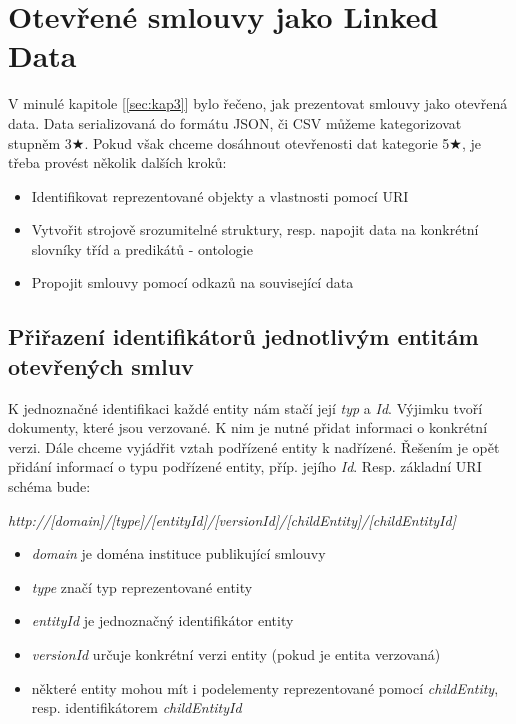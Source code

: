 \chapter{Otevřené smlouvy jako Linked Data}
\label{sec:kap4}

V minulé kapitole [\ref{sec:kap3}] bylo řečeno, jak prezentovat smlouvy jako otevřená data. Data serializovaná do formátu JSON, či CSV můžeme kategorizovat stupněm 3$\bigstar$. Pokud však chceme dosáhnout otevřenosti dat kategorie 5$\bigstar$, je třeba provést několik dalších kroků:

\begin{itemize}
\item Identifikovat reprezentované objekty a vlastnosti pomocí URI
\item Vytvořit strojově srozumitelné struktury, resp. napojit data na konkrétní slovníky tříd a predikátů - ontologie
\item Propojit smlouvy pomocí odkazů na související data
\end{itemize}

\section{Přiřazení identifikátorů jednotlivým entitám otevřených smluv}

K jednoznačné identifikaci každé entity nám stačí její \textit{typ} a \textit{Id}. Výjimku tvoří dokumenty, které jsou verzované. K nim je nutné přidat informaci o konkrétní verzi. Dále chceme vyjádřit vztah podřízené entity k nadřízené. Řešením je opět přidání informací o typu podřízené entity, příp. jejího \textit{Id}. Resp. základní URI schéma bude:

\bigskip

\textit{http://[domain]/[type]/[entityId]/[versionId]/[childEntity]/[childEntityId]}
\begin{itemize}
\item \textit{domain} je doména instituce publikující smlouvy
\item \textit{type} značí typ reprezentované entity
\item \textit{entityId} je jednoznačný identifikátor entity
\item \textit{versionId} určuje konkrétní verzi entity (pokud je entita verzovaná)
\item některé entity mohou mít i podelementy reprezentované pomocí \textit{childEntity}, resp. identifikátorem \textit{childEntityId}
\end{itemize}

